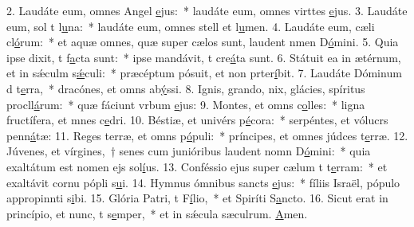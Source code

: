2. Laudáte eum, omnes Angel \uline{e}jus:~* laudáte eum, omnes virttes \uline{e}jus.
3. Laudáte eum, sol t l\uline{u}na:~* laudáte eum, omnes stell et l\uline{u}men.
4. Laudáte eum, cæli cl\uline{ó}rum:~* et aquæ omnes, quæ super cælos sunt, laudent nmen D\uline{ó}mini.
5. Quia ipse dixit, t f\uline{a}cta sunt:~* ipse mandávit, t cre\uline{á}ta sunt.
6. Státuit ea in ætérnum, et in sǽculm s\uline{ǽ}culi:~* præcéptum pósuit, et non prter\uline{í}bit.
7. Laudáte Dóminum d t\uline{e}rra,~* dracónes, et omns ab\uline{ý}ssi.
8. Ignis, grando, nix, glácies, spíritus procll\uline{á}rum:~* quæ fáciunt vrbum \uline{e}jus:
9. Montes, et omns c\uline{o}lles:~* ligna fructífera, et mnes c\uline{e}dri.
10. Béstiæ, et univérs p\uline{é}cora:~* serpéntes, et vólucrs penn\uline{á}tæ:
11. Reges terræ, et omns p\uline{ó}puli:~* príncipes, et omnes júdces t\uline{e}rræ.
12. Júvenes, et vírgines,~† senes cum junióribus laudent nomn D\uline{ó}mini:~* quia exaltátum est nomen ejs sol\uline{í}us.
13. Conféssio ejus super cælum t t\uline{e}rram:~* et exaltávit cornu pópli s\uline{u}i.
14. Hymnus ómnibus sancts \uline{e}jus:~* fíliis Israël, pópulo appropinnti s\uline{i}bi.
15. Glória Patri, t F\uline{í}lio,~* et Spiríti S\uline{a}ncto.
16. Sicut erat in princípio, et nunc, t s\uline{e}mper,~* et in sǽcula sæculrum. \uline{A}men.
